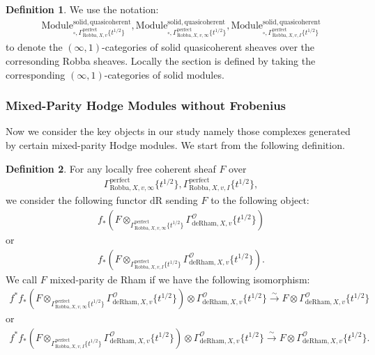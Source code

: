 \documentclass[12pt]{book}
\theoremstyle{definition}
\newtheorem{definition}{Definition}
\begin{document}
\begin{definition}
We use the notation:
\begin{align}
\mathrm{Module}^\mathrm{solid,quasicoherent}_{\square,\Gamma^\mathrm{perfect}_{\text{Robba},X,v}\{t^{1/2}\}},\mathrm{Module}^\mathrm{solid,quasicoherent}_{\square,\Gamma^\mathrm{perfect}_{\text{Robba},X,v,\infty}\{t^{1/2}\}},
\mathrm{Module}^\mathrm{solid,quasicoherent}_{\square,\Gamma^\mathrm{perfect}_{\text{Robba},X,v,I}\{t^{1/2}\}} 
\end{align}
to denote the $(\infty,1)$-categories of solid quasicoherent sheaves over the corresonding Robba sheaves. Locally the section is defined by taking the corresponding $(\infty,1)$-categories of solid modules.
\end{definition}


\subsubsection{Mixed-Parity Hodge Modules without Frobenius}

\noindent Now we consider the key objects in our study namely those complexes generated by certain mixed-parity Hodge modules. We start from the following definition.

\begin{definition}
For any locally free coherent sheaf $F$ over
\begin{align}
\Gamma^\mathrm{perfect}_{\text{Robba},X,v,\infty}\{t^{1/2}\},\Gamma^\mathrm{perfect}_{\text{Robba},X,v,I}\{t^{1/2}\},
\end{align} 
we consider the following functor $\mathrm{dR}$ sending $F$ to the following object:
\begin{align}
f_*(F\otimes_{\Gamma^\mathrm{perfect}_{\text{Robba},X,v,\infty}\{t^{1/2}\}} \Gamma^\mathcal{O}_{\text{deRham},X,v}\{t^{1/2}\})
\end{align}
or 
\begin{align}
f_*(F\otimes_{\Gamma^\mathrm{perfect}_{\text{Robba},X,v,I}\{t^{1/2}\}} \Gamma^\mathcal{O}_{\text{deRham},X,v}\{t^{1/2}\}).
\end{align}
We call $F$ mixed-parity de Rham if we have the following isomorphism:
\begin{align}
f^*f_*(F\otimes_{\Gamma^\mathrm{perfect}_{\text{Robba},X,v,\infty}\{t^{1/2}\}} \Gamma^\mathcal{O}_{\text{deRham},X,v}\{t^{1/2}\}) \otimes \Gamma^\mathcal{O}_{\text{deRham},X,v}\{t^{1/2}\} \overset{\sim}{\longrightarrow} F \otimes \Gamma^\mathcal{O}_{\text{deRham},X,v}\{t^{1/2}\} 
\end{align}
or 
\begin{align}
f^*f_*(F\otimes_{\Gamma^\mathrm{perfect}_{\text{Robba},X,v,I}\{t^{1/2}\}} \Gamma^\mathcal{O}_{\text{deRham},X,v}\{t^{1/2}\}) \otimes \Gamma^\mathcal{O}_{\text{deRham},X,v}\{t^{1/2}\} \overset{\sim}{\longrightarrow} F \otimes \Gamma^\mathcal{O}_{\text{deRham},X,v}\{t^{1/2}\}. 
\end{align}
\end{definition}
\end{document}

